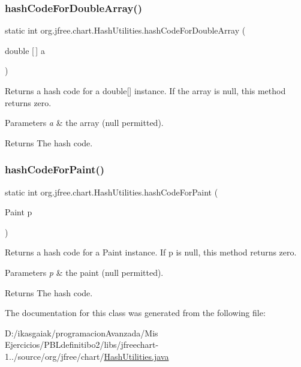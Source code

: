 \subsubsection{\texorpdfstring{hash\+Code\+For\+Double\+Array()}{hashCodeForDoubleArray()}}
{\footnotesize\ttfamily static int org.\+jfree.\+chart.\+Hash\+Utilities.\+hash\+Code\+For\+Double\+Array (\begin{DoxyParamCaption}\item[{double \mbox{[}$\,$\mbox{]}}]{a }\end{DoxyParamCaption})\hspace{0.3cm}{\ttfamily [static]}}

Returns a hash code for a {\ttfamily double\mbox{[}\mbox{]}} instance. If the array is {\ttfamily null}, this method returns zero.


\begin{DoxyParams}{Parameters}
{\em a} & the array ({\ttfamily null} permitted).\\
\hline
\end{DoxyParams}
\begin{DoxyReturn}{Returns}
The hash code. 
\end{DoxyReturn}
\mbox{\label{classorg_1_1jfree_1_1chart_1_1_hash_utilities_a272dce8293f08de8a41967f97ca1adf1}} 
\subsubsection{\texorpdfstring{hash\+Code\+For\+Paint()}{hashCodeForPaint()}}
{\footnotesize\ttfamily static int org.\+jfree.\+chart.\+Hash\+Utilities.\+hash\+Code\+For\+Paint (\begin{DoxyParamCaption}\item[{Paint}]{p }\end{DoxyParamCaption})\hspace{0.3cm}{\ttfamily [static]}}

Returns a hash code for a {\ttfamily Paint} instance. If {\ttfamily p} is {\ttfamily null}, this method returns zero.


\begin{DoxyParams}{Parameters}
{\em p} & the paint ({\ttfamily null} permitted).\\
\hline
\end{DoxyParams}
\begin{DoxyReturn}{Returns}
The hash code. 
\end{DoxyReturn}


The documentation for this class was generated from the following file\+:\begin{DoxyCompactItemize}
\item 
D\+:/ikasgaiak/programacion\+Avanzada/\+Mis Ejercicios/\+P\+B\+Ldefinitibo2/libs/jfreechart-\/1../source/org/jfree/chart/\mbox{\hyperlink{_hash_utilities_8java}{Hash\+Utilities.\+java}}\end{DoxyCompactItemize}
